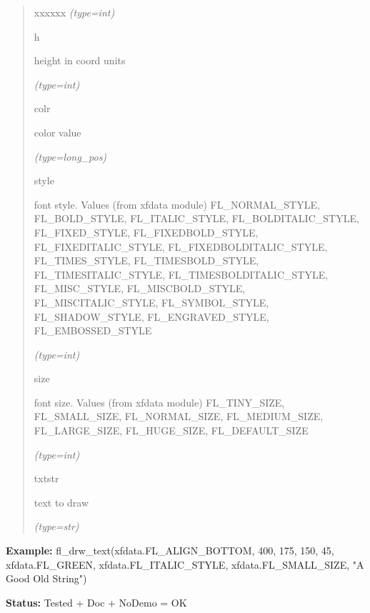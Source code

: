 \begin{boxedminipage}{\funcwidth}
\begin{quote}
\begin{Ventry}{xxxxxx}
            {\it (type=int)}

          \item[h]

          height in coord units

            {\it (type=int)}

          \item[colr]

          color value

            {\it (type=long\_pos)}

          \item[style]

          font style. Values (from xfdata module) FL\_NORMAL\_STYLE, 
          FL\_BOLD\_STYLE, FL\_ITALIC\_STYLE, FL\_BOLDITALIC\_STYLE, 
          FL\_FIXED\_STYLE, FL\_FIXEDBOLD\_STYLE, FL\_FIXEDITALIC\_STYLE, 
          FL\_FIXEDBOLDITALIC\_STYLE, FL\_TIMES\_STYLE, 
          FL\_TIMESBOLD\_STYLE, FL\_TIMESITALIC\_STYLE, 
          FL\_TIMESBOLDITALIC\_STYLE, FL\_MISC\_STYLE, FL\_MISCBOLD\_STYLE,
          FL\_MISCITALIC\_STYLE, FL\_SYMBOL\_STYLE, FL\_SHADOW\_STYLE, 
          FL\_ENGRAVED\_STYLE, FL\_EMBOSSED\_STYLE

            {\it (type=int)}

          \item[size]

          font size. Values (from xfdata module) FL\_TINY\_SIZE, 
          FL\_SMALL\_SIZE, FL\_NORMAL\_SIZE, FL\_MEDIUM\_SIZE, 
          FL\_LARGE\_SIZE, FL\_HUGE\_SIZE, FL\_DEFAULT\_SIZE

            {\it (type=int)}

          \item[txtstr]

          text to draw

            {\it (type=str)}

        \end{Ventry}

      \end{quote}

\textbf{Example:} fl\_drw\_text(xfdata.FL\_ALIGN\_BOTTOM, 400, 175, 150, 45, 
xfdata.FL\_GREEN, xfdata.FL\_ITALIC\_STYLE, xfdata.FL\_SMALL\_SIZE, "A Good
Old String")



\textbf{Status:} Tested + Doc + NoDemo = OK



    \end{boxedminipage}

